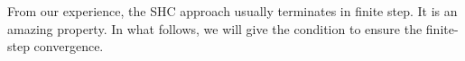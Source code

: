 \documentclass[preprint,12pt]{elsarticle}
\newtheorem{assume}{Assumption}
\newtheorem{theorem}{Theorem}
\begin{document}

From our experience, the SHC approach usually terminates in 
finite step. It is an amazing property. In what follows, we will
give the condition to ensure the finite-step convergence.

%
\end{document}

